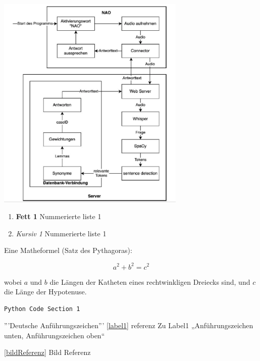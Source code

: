 \begin{center}%
    \includegraphics[width=9cm,keepaspectratio]{images/bisherigesProgramm.png}
    \label{bildReferenz}
\end{center}




\begin{enumerate}
    \item \textbf{Fett 1} Nummerierte liste 1
    \item \textit{Kursiv 1} Nummerierte liste 1
\end{enumerate}


Eine Matheformel (Satz des Pythagoras):

\[
a^2 + b^2 = c^2
\]

wobei \(a\) und \(b\) die Längen der Katheten eines rechtwinkligen Dreiecks sind, und \(c\) die Länge der Hypotenuse.



\begin{lstlisting}[caption={Pip Update}, label={lst:upgradePip}]
    Python Code Section 1
\end{lstlisting}


'''Deutsche Anführungszeichen''' \ref{label1} referenz Zu Label1 
„Anführungszeichen unten, Anführungszeichen oben“

\ref{bildReferenz} Bild Referenz

\newpage
